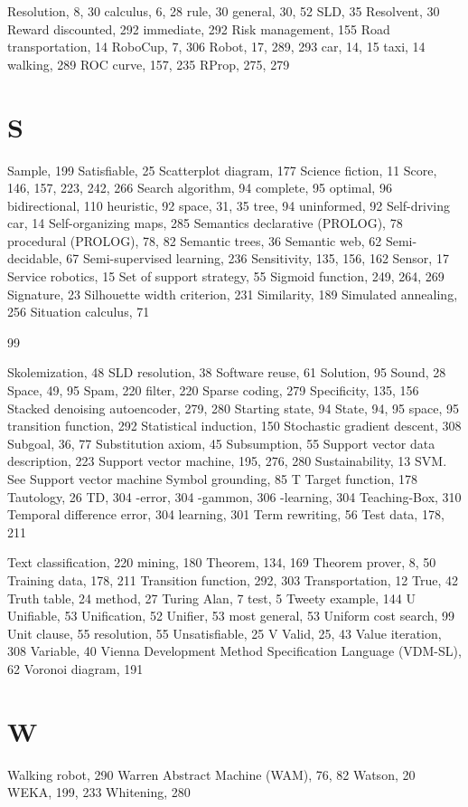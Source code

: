 \documentclass[10pt]{book}
\begin{document}
Resolution, 8, 30
calculus, 6, 28
rule, 30
general, 30, 52
SLD, 35
Resolvent, 30
Reward
discounted, 292
immediate, 292
Risk management, 155
Road transportation, 14
RoboCup, 7, 306
Robot, 17, 289, 293
car, 14, 15
taxi, 14
walking, 289
ROC curve, 157, 235
RProp, 275, 279

\section{S}

Sample, 199
Satisfiable, 25
Scatterplot diagram, 177
Science fiction, 11
Score, 146, 157, 223, 242, 266
Search
algorithm, 94
complete, 95
optimal, 96
bidirectional, 110
heuristic, 92
space, 31, 35
tree, 94
uninformed, 92
Self-driving car, 14
Self-organizing maps, 285
Semantics
declarative (PROLOG), 78
procedural (PROLOG), 78, 82
Semantic trees, 36
Semantic web, 62
Semi-decidable, 67
Semi-supervised learning, 236
Sensitivity, 135, 156, 162
Sensor, 17
Service robotics, 15
Set of support strategy, 55
Sigmoid function, 249, 264, 269
Signature, 23
Silhouette width criterion, 231
Similarity, 189
Simulated annealing, 256
Situation calculus, 71

\makeindex
\begin{thebibliography}{99}
\end{thebibliography}
\printindex
Skolemization, 48
SLD resolution, 38
Software reuse, 61
Solution, 95
Sound, 28
Space, 49, 95
Spam, 220
filter, 220
Sparse coding, 279
Specificity, 135, 156
Stacked denoising autoencoder, 279, 280
Starting state, 94
State, 94, 95
space, 95
transition function, 292
Statistical induction, 150
Stochastic gradient descent, 308
Subgoal, 36, 77
Substitution axiom, 45
Subsumption, 55
Support vector data description, 223
Support vector machine, 195, 276, 280
Sustainability, 13
SVM. See Support vector machine
Symbol grounding, 85
T
Target function, 178
Tautology, 26
TD, 304
-error, 304
-gammon, 306
-learning, 304
Teaching-Box, 310
Temporal difference
error, 304
learning, 301
Term
rewriting, 56
Test data, 178, 211

Text
classification, 220
mining, 180
Theorem, 134, 169
Theorem prover, 8, 50
Training data, 178, 211
Transition function, 292, 303
Transportation, 12
True, 42
Truth table, 24
method, 27
Turing
Alan, 7
test, 5
Tweety example, 144
U
Unifiable, 53
Unification, 52
Unifier, 53
most general, 53
Uniform cost search, 99
Unit
clause, 55
resolution, 55
Unsatisfiable, 25
V
Valid, 25, 43
Value iteration, 308
Variable, 40
Vienna Development Method Specification Language (VDM-SL), 62
Voronoi diagram, 191

\section{W}

Walking robot, 290
Warren Abstract Machine (WAM), 76, 82
Watson, 20
WEKA, 199, 233
Whitening, 280
\end{document}
